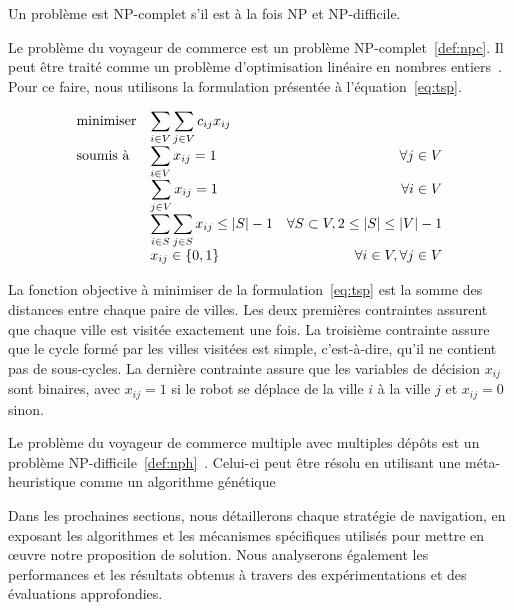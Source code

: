 \documentclass[english,RandD]{rapportPFE}  %
\begin{document}
				\begin{Definition}
					\label{def:npc}
					Un problème est NP-complet s'il est à la fois NP et NP-difficile.
				\end{Definition}

				Le problème du voyageur de commerce est un problème NP-complet~\ref{def:npc}.
				Il peut être traité comme un problème d'optimisation linéaire en nombres entiers~\cite{article244, gurobi25}.
				Pour ce faire, nous utilisons la formulation présentée à l'équation~\ref{eq:tsp}.

				\begin{equation}
					\label{eq:tsp}
					\begin{array}{ll@{}rr}
						\text{minimiser} &
						\displaystyle\sum\limits_{i \in V} \sum\limits_{j \in V} c_{ij} x_{ij} &
						&
						\\
						\text{soumis à} &
						\displaystyle\sum\limits_{i \in V} x_{ij} = 1 &
						&
						\forall j \in V \\
						&
						\displaystyle\sum\limits_{j \in V} x_{ij} = 1 &
						&
						\forall i \in V \\
						&
						\displaystyle\sum\limits_{i \in S} \sum\limits_{j \in S} x_{ij} \leq |S| - 1 &
						&
						\forall S \subset V, 2 \leq |S| \leq |V| - 1 \\
						&
						x_{ij} \in \{0, 1\} &
						&
						\forall i \in V, \forall j \in V \\
					\end{array}
				\end{equation}

				La fonction objective à minimiser de la formulation~\ref{eq:tsp} est la somme des distances entre chaque paire de villes.
				Les deux premières contraintes assurent que chaque ville est visitée exactement une fois.
				La troisième contrainte assure que le cycle formé par les villes visitées est simple, c'est-à-dire, qu'il ne contient pas de sous-cycles.
				La dernière contrainte assure que les variables de décision $x_{ij}$ sont binaires, avec $x_{ij} = 1$ si le robot se déplace de la ville $i$ à la ville $j$ et $x_{ij} = 0$ sinon.

				Le problème du voyageur de commerce multiple avec multiples dépôts est un problème NP-difficile~\ref{def:nph}~\cite{SUNDAR201639}.
				Celui-ci peut être résolu en utilisant une méta-heuristique comme un algorithme génétique~\cite{SinghMTSP, Kiraly2011}

				Dans les prochaines sections, nous détaillerons chaque stratégie de navigation, en exposant les algorithmes et les mécanismes spécifiques utilisés pour mettre en œuvre notre proposition de solution. Nous analyserons également les performances et les résultats obtenus à travers des expérimentations et des évaluations approfondies.
\end{document}
